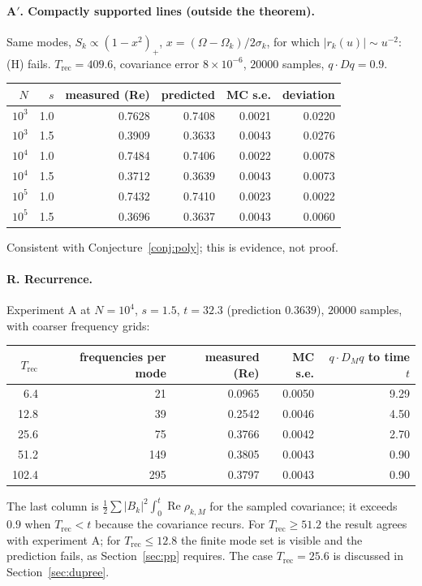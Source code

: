 \documentclass[11pt]{article}
\renewcommand{\Re}{\operatorname{Re}}
\theoremstyle{remark}
\begin{document}
\paragraph{A$'$. Compactly supported lines (outside the theorem).} Same
modes, $S_k\propto(1-x^2)_+$, $x = (\Omega-\Omega_k)/2\sigma_k$, for which
$|r_k(u)|\sim u^{-2}$: (H) fails. $T_{\mathrm{rec}} = 409.6$, covariance
error $8\times10^{-6}$, $20000$ samples, $q\cdot Dq = 0.9$.
\begin{center}
\begin{tabular}{rrrrrr}
  $N$ & $s$ & measured (Re) & predicted & MC s.e. & deviation \\ \hline
  $10^3$ & 1.0 & 0.7628 & 0.7408 & 0.0021 & 0.0220 \\
  $10^3$ & 1.5 & 0.3909 & 0.3633 & 0.0043 & 0.0276 \\
  $10^4$ & 1.0 & 0.7484 & 0.7406 & 0.0022 & 0.0078 \\
  $10^4$ & 1.5 & 0.3712 & 0.3639 & 0.0043 & 0.0073 \\
  $10^5$ & 1.0 & 0.7432 & 0.7410 & 0.0023 & 0.0022 \\
  $10^5$ & 1.5 & 0.3696 & 0.3637 & 0.0043 & 0.0060 \\
\end{tabular}
\end{center}
Consistent with Conjecture~\ref{conj:poly}; this is evidence, not proof.

\paragraph{R. Recurrence.} Experiment A at $N=10^4$, $s=1.5$, $t=32.3$
(prediction $0.3639$), $20000$ samples, with coarser frequency grids:
\begin{center}
\begin{tabular}{rrrrr}
  $T_{\mathrm{rec}}$ & frequencies per mode & measured (Re) & MC s.e. &
  $q\cdot D_Mq$ to time $t$ \\ \hline
  6.4 & 21 & 0.0965 & 0.0050 & 9.29 \\
  12.8 & 39 & 0.2542 & 0.0046 & 4.50 \\
  25.6 & 75 & 0.3766 & 0.0042 & 2.70 \\
  51.2 & 149 & 0.3805 & 0.0043 & 0.90 \\
  102.4 & 295 & 0.3797 & 0.0043 & 0.90 \\
\end{tabular}
\end{center}
The last column is $\frac12\sum|B_k|^2\int_0^t\Re\rho_{k,M}$ for the sampled
covariance; it exceeds $0.9$ when $T_{\mathrm{rec}}<t$ because the
covariance recurs. For $T_{\mathrm{rec}}\ge51.2$ the result agrees with
experiment A; for $T_{\mathrm{rec}}\le12.8$ the finite mode set is visible
and the prediction fails, as Section~\ref{sec:pp} requires. The case
$T_{\mathrm{rec}} = 25.6$ is discussed in Section~\ref{sec:dupree}.
\end{document}
